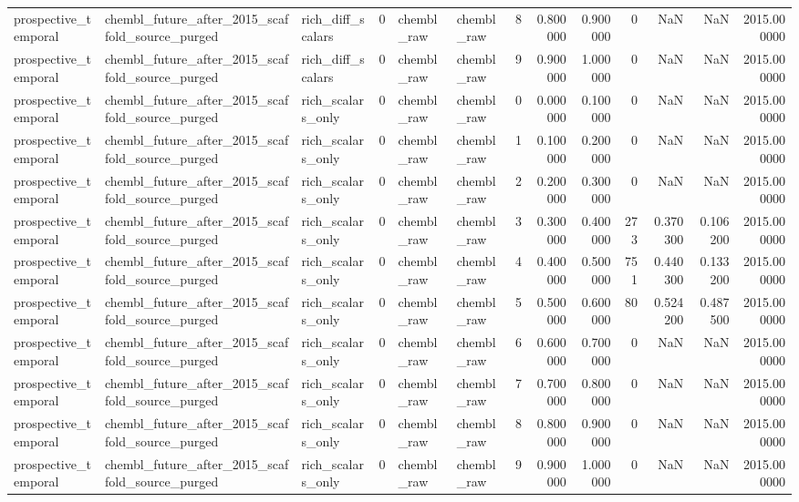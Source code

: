 \begin{longtable}{lllrllrrrrrrr}
prospective\_temporal & chembl\_future\_after\_2015\_scaffold\_source\_purged & rich\_diff\_scalars & 0 & chembl\_raw & chembl\_raw & 8 & 0.800000 & 0.900000 & 0 & NaN & NaN & 2015.000000 \\
prospective\_temporal & chembl\_future\_after\_2015\_scaffold\_source\_purged & rich\_diff\_scalars & 0 & chembl\_raw & chembl\_raw & 9 & 0.900000 & 1.000000 & 0 & NaN & NaN & 2015.000000 \\
prospective\_temporal & chembl\_future\_after\_2015\_scaffold\_source\_purged & rich\_scalars\_only & 0 & chembl\_raw & chembl\_raw & 0 & 0.000000 & 0.100000 & 0 & NaN & NaN & 2015.000000 \\
prospective\_temporal & chembl\_future\_after\_2015\_scaffold\_source\_purged & rich\_scalars\_only & 0 & chembl\_raw & chembl\_raw & 1 & 0.100000 & 0.200000 & 0 & NaN & NaN & 2015.000000 \\
prospective\_temporal & chembl\_future\_after\_2015\_scaffold\_source\_purged & rich\_scalars\_only & 0 & chembl\_raw & chembl\_raw & 2 & 0.200000 & 0.300000 & 0 & NaN & NaN & 2015.000000 \\
prospective\_temporal & chembl\_future\_after\_2015\_scaffold\_source\_purged & rich\_scalars\_only & 0 & chembl\_raw & chembl\_raw & 3 & 0.300000 & 0.400000 & 273 & 0.370300 & 0.106200 & 2015.000000 \\
prospective\_temporal & chembl\_future\_after\_2015\_scaffold\_source\_purged & rich\_scalars\_only & 0 & chembl\_raw & chembl\_raw & 4 & 0.400000 & 0.500000 & 751 & 0.440300 & 0.133200 & 2015.000000 \\
prospective\_temporal & chembl\_future\_after\_2015\_scaffold\_source\_purged & rich\_scalars\_only & 0 & chembl\_raw & chembl\_raw & 5 & 0.500000 & 0.600000 & 80 & 0.524200 & 0.487500 & 2015.000000 \\
prospective\_temporal & chembl\_future\_after\_2015\_scaffold\_source\_purged & rich\_scalars\_only & 0 & chembl\_raw & chembl\_raw & 6 & 0.600000 & 0.700000 & 0 & NaN & NaN & 2015.000000 \\
prospective\_temporal & chembl\_future\_after\_2015\_scaffold\_source\_purged & rich\_scalars\_only & 0 & chembl\_raw & chembl\_raw & 7 & 0.700000 & 0.800000 & 0 & NaN & NaN & 2015.000000 \\
prospective\_temporal & chembl\_future\_after\_2015\_scaffold\_source\_purged & rich\_scalars\_only & 0 & chembl\_raw & chembl\_raw & 8 & 0.800000 & 0.900000 & 0 & NaN & NaN & 2015.000000 \\
prospective\_temporal & chembl\_future\_after\_2015\_scaffold\_source\_purged & rich\_scalars\_only & 0 & chembl\_raw & chembl\_raw & 9 & 0.900000 & 1.000000 & 0 & NaN & NaN & 2015.000000 \\

\end{longtable}
